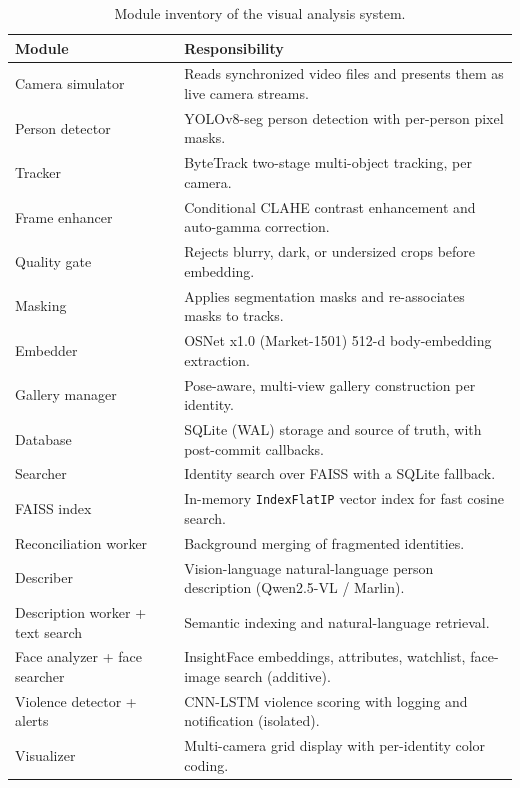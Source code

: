 \documentclass[12pt]{report}
\begin{document}
\begin{table}[H]
\centering
\begin{tabularx}{\textwidth}{|l|X|}
\hline
\textbf{Module} & \textbf{Responsibility} \\
\hline
Camera simulator & Reads synchronized video files and presents them as live camera streams. \\
\hline
Person detector & YOLOv8-seg person detection with per-person pixel masks. \\
\hline
Tracker & ByteTrack two-stage multi-object tracking, per camera. \\
\hline
Frame enhancer & Conditional CLAHE contrast enhancement and auto-gamma correction. \\
\hline
Quality gate & Rejects blurry, dark, or undersized crops before embedding. \\
\hline
Masking & Applies segmentation masks and re-associates masks to tracks. \\
\hline
Embedder & OSNet x1.0 (Market-1501) 512-d body-embedding extraction. \\
\hline
Gallery manager & Pose-aware, multi-view gallery construction per identity. \\
\hline
Database & SQLite (WAL) storage and source of truth, with post-commit callbacks. \\
\hline
Searcher & Identity search over FAISS with a SQLite fallback. \\
\hline
FAISS index & In-memory \texttt{IndexFlatIP} vector index for fast cosine search. \\
\hline
Reconciliation worker & Background merging of fragmented identities. \\
\hline
Describer & Vision-language natural-language person description (Qwen2.5-VL / Marlin). \\
\hline
Description worker + text search & Semantic indexing and natural-language retrieval. \\
\hline
Face analyzer + face searcher & InsightFace embeddings, attributes, watchlist, face-image search (additive). \\
\hline
Violence detector + alerts & CNN-LSTM violence scoring with logging and notification (isolated). \\
\hline
Visualizer & Multi-camera grid display with per-identity color coding. \\
\hline
\end{tabularx}
\caption{Module inventory of the visual analysis system.}
\label{tab:modules}
\end{table}
\end{document}
